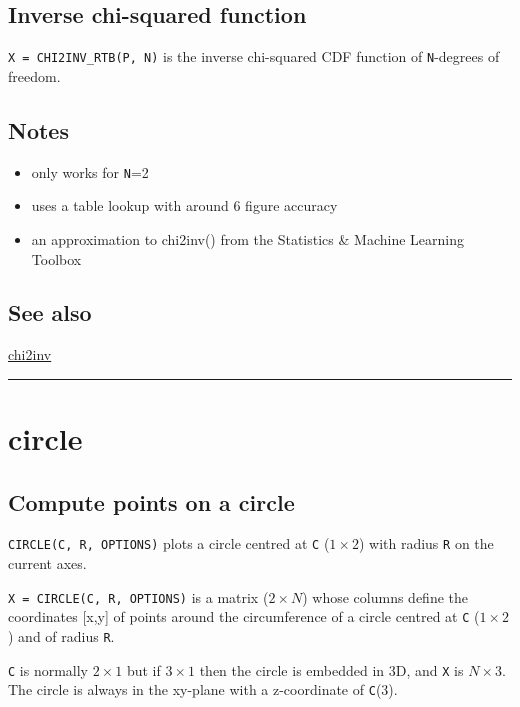 \subsection*{Inverse chi-squared function}


\texttt{X = CHI2INV\_RTB(P, N)} is the inverse chi-squared CDF function of \texttt{N}-degrees of freedom.


\subsection*{Notes}
\begin{itemize}
  \item only works for \texttt{N}=2
  \item uses a table lookup with around 6 figure accuracy
  \item an approximation to chi2inv() from the Statistics \& Machine Learning Toolbox
\end{itemize}

\subsection*{See also}


\hyperlink{chi2inv}{\color{blue} chi2inv}

\vspace{1.5ex}\rule{\textwidth}{1mm}

\hypertarget{circle}{\section*{circle}}
\subsection*{Compute points on a circle}


\texttt{CIRCLE(C, R, OPTIONS)} plots a circle centred at \texttt{C} ($1 \times 2$) with radius \texttt{R} on the current
axes.



\texttt{X = CIRCLE(C, R, OPTIONS)} is a matrix ($2 \times N$) whose columns define the
coordinates [x,y] of points around the circumference of a circle
centred at \texttt{C} ($1 \times 2$) and of radius \texttt{R}.



\texttt{C} is normally $2 \times 1$ but if $3 \times 1$ then the circle is embedded in 3D, and \texttt{X} is $N \times 3$.
The circle is always in the xy-plane with a z-coordinate of \texttt{C}(3).


